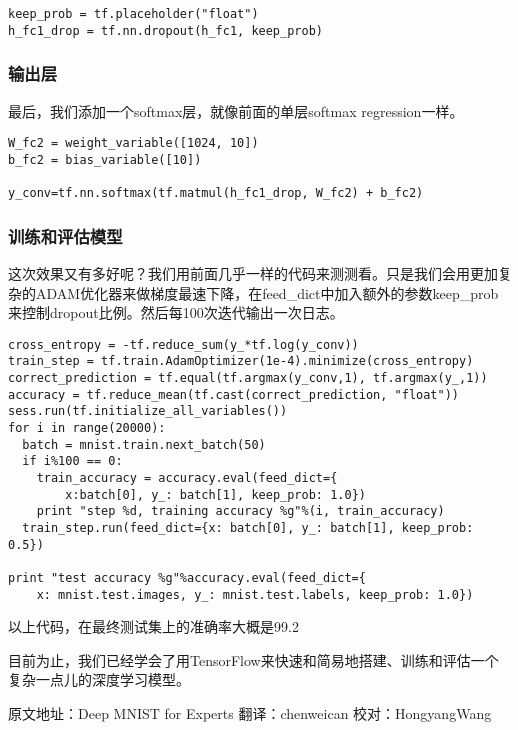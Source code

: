 \begin{lstlisting}
keep_prob = tf.placeholder("float")
h_fc1_drop = tf.nn.dropout(h_fc1, keep_prob)
\end{lstlisting}

\subsubsection{输出层}

最后，我们添加一个softmax层，就像前面的单层softmax regression一样。

\begin{lstlisting}
W_fc2 = weight_variable([1024, 10])
b_fc2 = bias_variable([10])

y_conv=tf.nn.softmax(tf.matmul(h_fc1_drop, W_fc2) + b_fc2)
\end{lstlisting}

\subsubsection{训练和评估模型}

这次效果又有多好呢？我们用前面几乎一样的代码来测测看。只是我们会用更加复杂的ADAM优化器来做梯度最速下降，在feed\_dict中加入额外的参数keep\_prob来控制dropout比例。然后每100次迭代输出一次日志。

\begin{lstlisting}
cross_entropy = -tf.reduce_sum(y_*tf.log(y_conv))
train_step = tf.train.AdamOptimizer(1e-4).minimize(cross_entropy)
correct_prediction = tf.equal(tf.argmax(y_conv,1), tf.argmax(y_,1))
accuracy = tf.reduce_mean(tf.cast(correct_prediction, "float"))
sess.run(tf.initialize_all_variables())
for i in range(20000):
  batch = mnist.train.next_batch(50)
  if i%100 == 0:
    train_accuracy = accuracy.eval(feed_dict={
        x:batch[0], y_: batch[1], keep_prob: 1.0})
    print "step %d, training accuracy %g"%(i, train_accuracy)
  train_step.run(feed_dict={x: batch[0], y_: batch[1], keep_prob: 0.5})

print "test accuracy %g"%accuracy.eval(feed_dict={
    x: mnist.test.images, y_: mnist.test.labels, keep_prob: 1.0})
\end{lstlisting}

以上代码，在最终测试集上的准确率大概是99.2%

目前为止，我们已经学会了用TensorFlow来快速和简易地搭建、训练和评估一个复杂一点儿的深度学习模型。

原文地址：Deep MNIST for Experts
翻译：chenweican
校对：HongyangWang